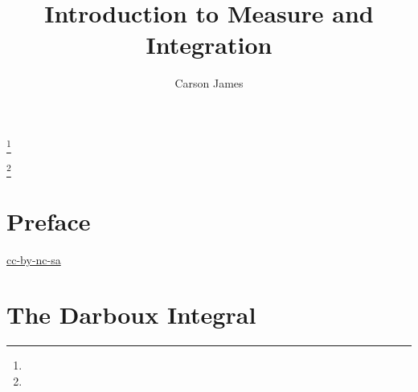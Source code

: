 \documentclass{book}
\theoremstyle{definition}
\DeclareMathOperator*{\0}{\mbf{0}}
\DeclareMathOperator*{\1}{\mbf{1}}
\begin{document}
	
	\frontmatter
	
	\title{Introduction to Measure and Integration}
	
	
	\author{Carson James}
	\thanks{}
	
	\author{}
	\thanks{}
	
	\date{}
	
	\maketitle
	
	
	\setcounter{page}{4}
	
	\tableofcontents
	\printunsrtglossary[type=symbols,style=long,title={Notation}]
	
	
	\mainmatter
	
	\chapter*{Preface}
	
	\begin{flushleft}
		\href{https://creativecommons.org/licenses/by-nc-sa/4.0/legalcode.txt}{cc-by-nc-sa}
	\end{flushleft}

	\newpage
	
	
	
	
	
	
	
	
	
	
	
	
	\chapter{The Darboux Integral}
	
\end{document}
